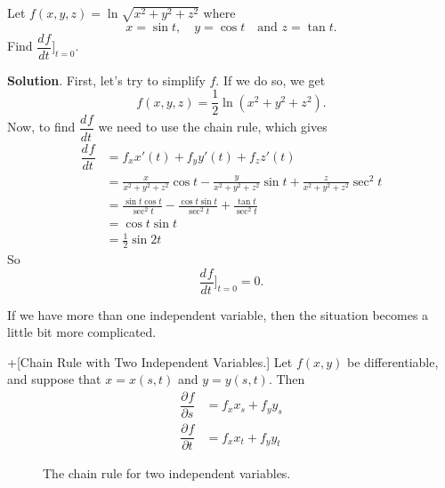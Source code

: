 \documentclass[10pt,]{book}
\theoremstyle{ptxplainnotitle}
\theoremstyle{ptxplaintitle}
\theoremstyle{ptxplainnotitle}
\theoremstyle{ptxplaintitle}
\theoremstyle{ptxplainnotitle}
\theoremstyle{ptxplaintitle}
\theoremstyle{ptxdefinitionnotitle}
\theoremstyle{ptxdefinitiontitle}
\theoremstyle{ptxdefinitionnotitle}
\theoremstyle{ptxdefinitiontitle}
\theoremstyle{ptxdefinitionnotitle}
\theoremstyle{ptxdefinitiontitle}
\theoremstyle{ptxdefinitionnotitle}
\theoremstyle{ptxdefinitiontitle}
\theoremstyle{ptxdefinitionnotitle}
\theoremstyle{ptxdefinitiontitle}
\numberwithin{equation}{section}
\newcommand{\dv}[3][]{\dfrac{d^{#1} #2}{d #3^{#1}}}
\newcommand{\pdv}[3][]{\dfrac{\partial^{#1} #2}{\partial #3^{#1}}}
\begin{document}
\begin{example}\label{example-using-the-chain-rule}
\hypertarget{p-1043}{}%
Let \(f(x,y,z) = \ln\sqrt{x^{2}+y^{2}+z^{2}}\) where%
\begin{equation*}
x = \sin t,\quad y = \cos t\quad\text{and } z = \tan t.
\end{equation*}
Find \(\dv{f}{t}\bigg]_{t=0}\).%
\par\smallskip%
\noindent\textbf{Solution}.\hypertarget{solution-162}{}\quad%
\hypertarget{p-1044}{}%
First, let's try to simplify \(f\). If we do so, we get%
\begin{equation*}
f(x,y,z) = \frac{1}{2}\ln(x^{2} + y^{2} + z^{2}).
\end{equation*}
Now, to find \(\dv{f}{t}\) we need to use the chain rule, which gives%
\begin{align*}
\dv{f}{t} & = f_{x}x'(t) + f_{y}y'(t) + f_{z}z'(t) \\
& = \frac{x}{x^{2} + y^{2} + z^{2}}\cos t  - \frac{y}{x^{2} + y^{2} + z^{2}}\sin t + \frac{z}{x^{2} + y^{2} + z^{2}}\sec^{2}t\\
& = \frac{\sin t\cos t}{\sec^{2}t} - \frac{\cos t\sin t}{\sec^{2}t} + \frac{\tan t}{\sec^{2}t}\\
& = \cos t\sin t \\
& = \frac{1}{2}\sin2t 
\end{align*}
So%
\begin{equation*}
\dv{f}{t}\bigg]_{t=0} = 0.
\end{equation*}
%
\end{example}
\hypertarget{p-1045}{}%
If we have more than one independent variable, then the situation becomes a little bit more complicated.%
\begin{theorem}+[{Chain Rule with Two Independent Variables.}]\label{theorem-chain-rule-with-two-independent-variables}
\hypertarget{p-1046}{}%
Let \(f(x,y)\) be differentiable, and suppose that \(x = x(s,t)\) and \(y = y(s,t)\). Then%
\begin{align*}
\pdv{f}{s} & = f_{x}x_{s} + f_{y}y_{s} \\
\pdv{f}{t} & = f_{x}x_{t} + f_{y}y_{t} 
\end{align*}
%
\end{theorem}
\begin{figure}
\centering
{
}
\caption{The chain rule for two independent variables.\label{figure-chain-rule-two-independent-variables}}
\end{figure}
\end{document}
